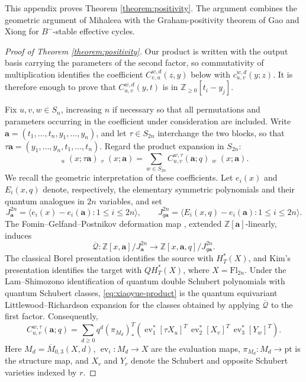 \documentclass{amsart}
\theoremstyle{definition}
\theoremstyle{remark}
\numberwithin{equation}{section}
\DeclareMathOperator{\qsch}{\widetilde{\mathfrak{S}}}
\begin{document}
This appendix proves Theorem \ref{theorem:positivity}. The argument combines the geometric argument of Mihalcea \cite{mihalcea2006positivity} with the Graham-positivity theorem of Gao and Xiong \cite{gao2025grahampositivitytripleschubert} for $B^-$-stable effective cycles.

\begin{proof}[Proof of Theorem \ref{theorem:positivity}]
Our product is written with the output basis carrying the parameters of the second factor, so commutativity of multiplication identifies the coefficient $C_{v,u}^{w,d}(z,y)$ below with $c_{u,v}^{w,d}(y;z)$. It is therefore enough to prove that $C_{u,v}^{w,d}(y,t)$ is in $\mathbb{Z}_{\geq 0}[t_i-y_j]$.

Fix $u,v,w\in S_n$, increasing $n$ if necessary so that all permutations and parameters occurring in the coefficient under consideration are included. Write
$\mathbf a=(t_1,\ldots,t_n,y_1,\ldots,y_n)$, and let $\tau\in S_{2n}$ interchange the two blocks, so that $\tau\mathbf a=(y_1,\ldots,y_n,t_1,\ldots,t_n)$. Regard the product expansion in $S_{2n}$:
\begin{equation}\label{eq:xiaoyue-product}
\qsch_u(x;\tau\mathbf a)\qsch_v(x;\mathbf a)
=\sum_{w\in S_{2n}}C_{u,v}^{w,\tau}(\mathbf a;q)\qsch_w(x;\mathbf a).
\end{equation}
We recall the geometric interpretation of these coefficients. Let $e_i(x)$ and $E_i(x,q)$ denote, respectively, the elementary symmetric polynomials and their quantum analogues in $2n$ variables, and set
\[
J_{\mathbf a}^{2n}=\langle e_i(x)-e_i(\mathbf a):1\leq i\leq 2n\rangle,\qquad
J_{q\mathbf a}^{2n}=\langle E_i(x,q)-e_i(\mathbf a):1\leq i\leq 2n\rangle.
\]
The Fomin--Gelfand--Postnikov deformation map \cite{fomin1997quantum}, extended $\mathbb Z[\mathbf a]$-linearly, induces
\[
\overline{\mathcal Q}:\mathbb Z[x,\mathbf a]/J_{\mathbf a}^{2n}
\longrightarrow \mathbb Z[x,\mathbf a,q]/J_{q\mathbf a}^{2n}.
\]
The classical Borel presentation identifies the source with $H_T^*(X)$, and Kim's presentation \cite{kim1996equivariant} identifies the target with $QH_T^*(X)$, where $X=\mathrm{Fl}_{2n}$. Under the Lam--Shimozono identification \cite{lam2014quantum} of quantum double Schubert polynomials with quantum Schubert classes, \eqref{eq:xiaoyue-product} is the quantum equivariant Littlewood--Richardson expansion for the classes obtained by applying $\overline{\mathcal Q}$ to the first factor. Consequently,
\begin{equation}\label{eq:xiaoyue-eqlr}
C_{u,v}^{w,\tau}(\mathbf a;q)
=\sum_{d\geq0}q^d(\pi_{M_d})^T_*
\left(
\operatorname{ev}_1^*[\tau X_u]^T\,
\operatorname{ev}_2^*[X_v]^T\,
\operatorname{ev}_3^*[Y_w]^T
\right).
\end{equation}
Here $M_d=\overline M_{0,3}(X,d)$, $\operatorname{ev}_i:M_d\to X$ are the evaluation maps, $\pi_{M_d}:M_d\to\mathrm{pt}$ is the structure map, and $X_r$ and $Y_r$ denote the Schubert and opposite Schubert varieties indexed by $r$.


\end{proof}
\end{document}
